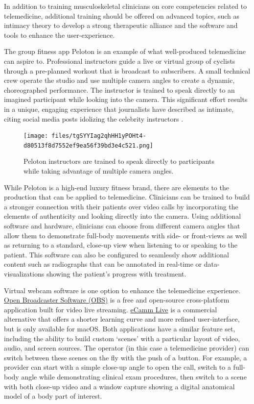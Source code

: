 \documentclass[utf8]{FrontiersinHarvard} %
\begin{document}
In addition to training musculoskeletal clinicians on core competencies related to telemedicine, additional training should be offered on advanced topics, such as intimacy theory to develop a strong therapeutic alliance and the software and tools to enhance the user-experience.

The group fitness app Peloton is an example of what well-produced telemedicine can aspire to. Professional instructors guide a live or virtual group of cyclists through a pre-planned workout that is broadcast to subscribers. A small technical crew operate the studio and use multiple camera angles to create a dynamic, choreographed performance. The instructor is trained to speak directly to an imagined participant while looking into the camera. This significant effort results in a unique, engaging experience that journalists have described as intimate, citing social media posts idolizing the celebrity instructors \citep{bryantTheresIntimacyWhat2020}.

\begin{figure}[!htbp]
\centering
\texttt{[image: files/tgSYYIag2qhHH1yPOHt4-d80513f8d7552ef9ea56f39bd3e4c521.png]}
\caption[]{Peloton instructors are trained to speak directly to participants while taking advantage of multiple camera angles.}
\label{zDL8HO3c8L}
\end{figure}

While Peloton is a high-end luxury fitness brand, there are elements to the production that can be applied to telemedicine. Clinicians can be trained to build a stronger connection with their patients over video calls by incorporating the elements of authenticity and looking directly into the camera. Using additional software and hardware, clinicians can choose from different camera angles that allow them to demonstrate full-body movements with side- or front-views as well as returning to a standard, close-up view when listening to or speaking to the patient. This software can also be configured to seamlessly show additional content such as radiographs that can be annotated in real-time or data-visualizations showing the patient's progress with treatment.

Virtual webcam software is one option to enhance the telemedicine experience. \href{https://obsproject.com/}{Open Broadcaster Software (OBS)} is a free and open-source cross-platform application built for video live streaming. \href{https://ecamm.com/}{eCamm Live} is a commercial alternative that offers a shorter learning curve and more refined user-interface, but is only available for macOS. Both applications have a similar feature set, including the ability to build custom `scenes' with a particular layout of video, audio, and screen sources. The operator (in this case a telemedicine provider) can switch between these scenes on the fly with the push of a button. For example, a provider can start with a simple close-up angle to open the call, switch to a full-body angle while demonstrating clinical exam procedures, then switch to a scene with both close-up video and a window capture showing a digital anatomical model of a body part of interest.
\end{document}
